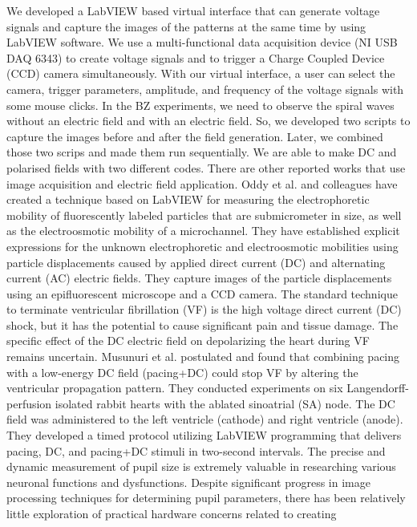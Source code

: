 \documentclass[journal=jacsat,manuscript=article]{achemso}
\begin{document}
We developed a LabVIEW based virtual interface that can generate voltage signals and
capture the images of the patterns at the same time by using LabVIEW software. We use a multi-functional data acquisition device (NI USB DAQ 6343) to create voltage signals and to trigger a Charge Coupled Device (CCD) camera simultaneously. With our virtual interface, a user can select
the camera, trigger parameters, amplitude, and frequency of the
voltage signals with some mouse clicks. In the BZ experiments, we need
to observe the spiral waves without an electric field and with an
electric field. So, we developed two scripts to capture the images
before and after the field generation. Later, we combined those two
scrips and made them run sequentially. We are able to make DC and
polarised fields with two different codes.  There are other reported
works that use image acquisition and electric field
application. \cite{oddy2004method} Oddy et al. and colleagues have
created a technique based on LabVIEW for measuring the electrophoretic
mobility of fluorescently labeled particles that are submicrometer in
size, as well as the electroosmotic mobility of a microchannel. They
have established explicit expressions for the unknown electrophoretic
and electroosmotic mobilities using particle displacements caused by
applied direct current (DC) and alternating current (AC) electric
fields. They capture images of the particle displacements using an
epifluorescent microscope and a CCD camera.  The standard technique to
terminate ventricular fibrillation (VF) is the high voltage direct
current (DC) shock, but it has the potential to cause significant pain
and tissue damage. The specific effect of the DC electric field on
depolarizing the heart during VF remains
uncertain. \cite{musunuri2009ventricular} Musunuri et al. postulated
and found that combining pacing with a low-energy DC field (pacing+DC)
could stop VF by altering the ventricular propagation pattern. They
conducted experiments on six Langendorff-perfusion isolated rabbit
hearts with the ablated sinoatrial (SA) node. The DC field was
administered to the left ventricle (cathode) and right ventricle
(anode). They developed a timed protocol utilizing LabVIEW programming
that delivers pacing, DC, and pacing+DC stimuli in two-second
intervals.  The precise and dynamic measurement of pupil size is
extremely valuable in researching various neuronal functions and
dysfunctions. Despite significant progress in image processing
techniques for determining pupil parameters, there has been relatively
little exploration of practical hardware concerns related to creating
\end{document}
